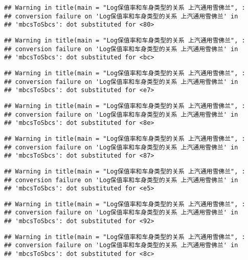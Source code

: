\documentclass[]{article}
\begin{document}
\begin{verbatim}
## Warning in title(main = "Log保值率和车身类型的关系 上汽通用雪佛兰", :
## conversion failure on 'Log保值率和车身类型的关系 上汽通用雪佛兰' in
## 'mbcsToSbcs': dot substituted for <80>
\end{verbatim}

\begin{verbatim}
## Warning in title(main = "Log保值率和车身类型的关系 上汽通用雪佛兰", :
## conversion failure on 'Log保值率和车身类型的关系 上汽通用雪佛兰' in
## 'mbcsToSbcs': dot substituted for <bc>
\end{verbatim}

\begin{verbatim}
## Warning in title(main = "Log保值率和车身类型的关系 上汽通用雪佛兰", :
## conversion failure on 'Log保值率和车身类型的关系 上汽通用雪佛兰' in
## 'mbcsToSbcs': dot substituted for <e7>
\end{verbatim}

\begin{verbatim}
## Warning in title(main = "Log保值率和车身类型的关系 上汽通用雪佛兰", :
## conversion failure on 'Log保值率和车身类型的关系 上汽通用雪佛兰' in
## 'mbcsToSbcs': dot substituted for <8e>
\end{verbatim}

\begin{verbatim}
## Warning in title(main = "Log保值率和车身类型的关系 上汽通用雪佛兰", :
## conversion failure on 'Log保值率和车身类型的关系 上汽通用雪佛兰' in
## 'mbcsToSbcs': dot substituted for <87>
\end{verbatim}

\begin{verbatim}
## Warning in title(main = "Log保值率和车身类型的关系 上汽通用雪佛兰", :
## conversion failure on 'Log保值率和车身类型的关系 上汽通用雪佛兰' in
## 'mbcsToSbcs': dot substituted for <e5>
\end{verbatim}

\begin{verbatim}
## Warning in title(main = "Log保值率和车身类型的关系 上汽通用雪佛兰", :
## conversion failure on 'Log保值率和车身类型的关系 上汽通用雪佛兰' in
## 'mbcsToSbcs': dot substituted for <92>
\end{verbatim}

\begin{verbatim}
## Warning in title(main = "Log保值率和车身类型的关系 上汽通用雪佛兰", :
## conversion failure on 'Log保值率和车身类型的关系 上汽通用雪佛兰' in
## 'mbcsToSbcs': dot substituted for <8c>
\end{verbatim}
\end{document}
